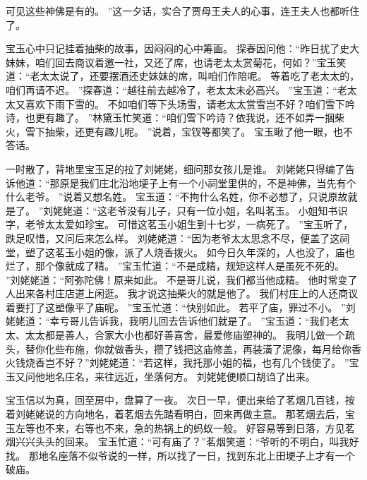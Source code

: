 可见这些神佛是有的。
”这一夕话，实合了贾母王夫人的心事，连王夫人也都听住了。
\par
宝玉心中只记挂着抽柴的故事，因闷闷的心中筹画。
探春因问他：“昨日扰了史大妹妹，咱们回去商议着邀一社，又还了席，也请老太太赏菊花，何如？”宝玉笑道：“老太太说了，还要摆酒还史妹妹的席，叫咱们作陪呢。
等着吃了老太太的，咱们再请不迟。
”探春道：“越往前去越冷了，老太太未必高兴。
”宝玉道：“老太太又喜欢下雨下雪的。
不如咱们等下头场雪，请老太太赏雪岂不好？咱们雪下吟诗，也更有趣了。
”林黛玉忙笑道：“咱们雪下吟诗？依我说，还不如弄一捆柴火，雪下抽柴，还更有趣儿呢。
”说着，宝钗等都笑了。
宝玉瞅了他一眼，也不答话。
\par
一时散了，背地里宝玉足的拉了刘姥姥，细问那女孩儿是谁。
刘姥姥只得编了告诉他道：“那原是我们庄北沿地埂子上有一个小祠堂里供的，不是神佛，当先有个什么老爷。
”说着又想名姓。
宝玉道：“不拘什么名姓，你不必想了，只说原故就是了。
”刘姥姥道：“这老爷没有儿子，只有一位小姐，名叫茗玉。
小姐知书识字，老爷太太爱如珍宝。
可惜这茗玉小姐生到十七岁，一病死了。
”宝玉听了，跌足叹惜，又问后来怎么样。
刘姥姥道：“因为老爷太太思念不尽，便盖了这祠堂，塑了这茗玉小姐的像，派了人烧香拨火。
如今日久年深的，人也没了，庙也烂了，那个像就成了精。
”宝玉忙道：“不是成精，规矩这样人是虽死不死的。
”刘姥姥道：“阿弥陀佛！原来如此。
不是哥儿说，我们都当他成精。
他时常变了人出来各村庄店道上闲逛。
我才说这抽柴火的就是他了。
我们村庄上的人还商议着要打了这塑像平了庙呢。
”宝玉忙道：“快别如此。
若平了庙，罪过不小。
”刘姥姥道：“幸亏哥儿告诉我，我明儿回去告诉他们就是了。
”宝玉道：“我们老太太、太太都是善人，合家大小也都好善喜舍，最爱修庙塑神的。
我明儿做一个疏头，替你化些布施，你就做香头，攒了钱把这庙修盖，再装潢了泥像，每月给你香火钱烧香岂不好？”刘姥姥道：“若这样，我托那小姐的福，也有几个钱使了。
”宝玉又问他地名庄名，来往远近，坐落何方。
刘姥姥便顺口胡诌了出来。
\par
宝玉信以为真，回至房中，盘算了一夜。
次日一早，便出来给了茗烟几百钱，按着刘姥姥说的方向地名，着茗烟去先踏看明白，回来再做主意。
那茗烟去后，宝玉左等也不来，右等也不来，急的热锅上的蚂蚁一般。
好容易等到日落，方见茗烟兴兴头头的回来。
宝玉忙道：“可有庙了？”茗烟笑道：“爷听的不明白，叫我好找。
那地名座落不似爷说的一样，所以找了一日，找到东北上田埂子上才有一个破庙。
